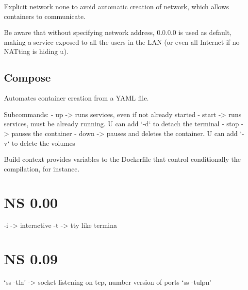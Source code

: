  Explicit network none to avoid automatic creation of network, which allows containers to communicate.

 Be aware that without specifying network address, 0.0.0.0 is used as default, making a service exposed to all the users in the LAN (or even all Internet if no NATting is hiding u).

\subsection{Compose}
Automates container creation from a YAML file.

Subcommands:
 - up -> runs services, even if not already started
 - start -> runs services, must be already running. U can add `-d` to detach the terminal
 - stop -> pauses the container
 - down -> pauses and deletes the container. U can add `-v` to delete the volumes

Build context provides variables to the Dockerfile that control conditionally the compilation, for instance.

\section{NS 0.00}
-i -> interactive
-t -> tty like termina

\section{NS 0.09}
`ss -tln' -> socket listening on tcp, number version of ports
`ss -tulpn'